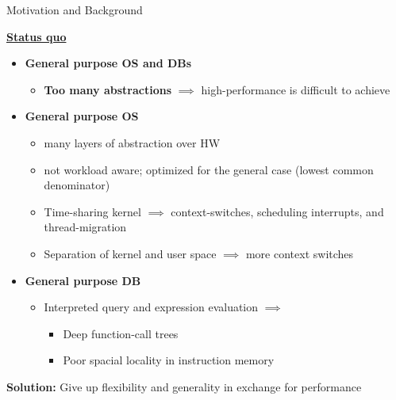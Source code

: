 \begin{block}{Motivation and Background}

\underline{\textbf{Status quo}}
  \begin{itemize}
  \item \textbf{General purpose OS and DBs}%
    \begin{itemize}
     \item \textbf{Too many abstractions} $\implies$ high-performance is difficult
      to achieve~\cite{GICEVA:2016:OS_SUPPORT,HALE:2015:NAUTILUS}
    \end{itemize}
  \item \textbf{General purpose OS}
    \begin{itemize}
    \item many layers of abstraction over HW
    \item not workload aware; optimized for the general case (lowest common denominator)
    \item Time-sharing kernel $\implies$ context-switches, scheduling interrupts, and thread-migration
    \item Separation of kernel and user space $\implies$ more context switches
    \end{itemize}
  \item \textbf{General purpose DB}
    \begin{itemize}
    \item Interpreted query and expression evaluation  $\implies$
      \begin{itemize}
      \item Deep function-call trees
    \item Poor spacial locality in instruction memory
    \end{itemize}
    \end{itemize}
  \end{itemize}

  \begin{center}
    \alert{\textbf{Solution:} Give up flexibility and generality in exchange for performance}
  \end{center}
   

\end{block}
